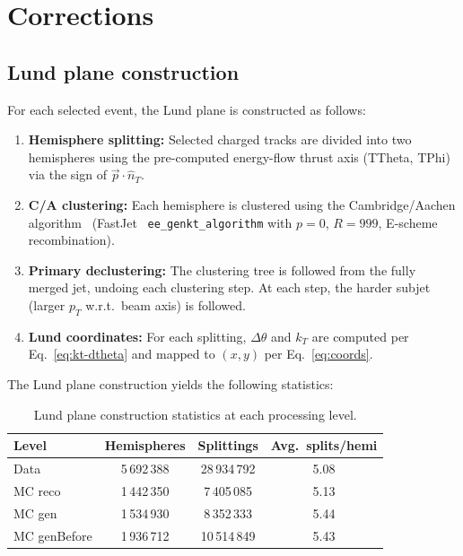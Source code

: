 \documentclass[11pt,a4paper]{article}
\begin{document}
\section{Corrections}
\label{sec:corrections}

\subsection{Lund plane construction}
\label{sec:lund-construction}

For each selected event, the Lund plane is constructed as follows:
\begin{enumerate}
\item \textbf{Hemisphere splitting:} Selected charged tracks are
  divided into two hemispheres using the pre-computed energy-flow thrust
  axis (TTheta, TPhi) via the sign of $\vec{p} \cdot \hat{n}_T$.
\item \textbf{C/A clustering:} Each hemisphere is clustered using the
  Cambridge/Aachen algorithm~\cite{Dokshitzer:1997in}
  (FastJet~\cite{Cacciari:2011ma} \texttt{ee\_genkt\_algorithm} with
  $p = 0$, $R = 999$, E-scheme recombination).
\item \textbf{Primary declustering:} The clustering tree is followed
  from the fully merged jet, undoing each clustering step.  At each
  step, the harder subjet (larger $p_T$ w.r.t.\ beam axis) is followed.
\item \textbf{Lund coordinates:} For each splitting, $\Delta\theta$ and
  $k_T$ are computed per Eq.~\eqref{eq:kt-dtheta} and mapped to
  $(x, y)$ per Eq.~\eqref{eq:coords}.
\end{enumerate}

The Lund plane construction yields the following statistics:
\begin{table}[htbp]
\centering
\caption{Lund plane construction statistics at each processing level.}
\label{tbl:lund-stats}
\begin{tabular}{lccc}
\toprule
Level & Hemispheres & Splittings & Avg.\ splits/hemi \\
\midrule
Data & 5\,692\,388 & 28\,934\,792 & 5.08 \\
MC reco & 1\,442\,350 & 7\,405\,085 & 5.13 \\
MC gen & 1\,534\,930 & 8\,352\,333 & 5.44 \\
MC genBefore & 1\,936\,712 & 10\,514\,849 & 5.43 \\
\bottomrule
\end{tabular}
\end{table}
\end{document}
